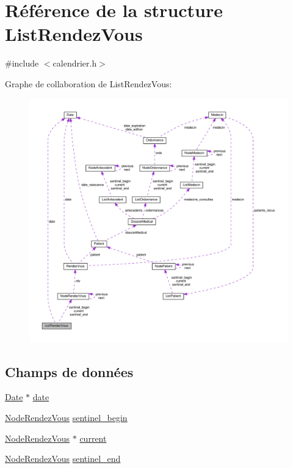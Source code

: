 \hypertarget{struct_list_rendez_vous}{\section{Référence de la structure List\-Rendez\-Vous}
\label{struct_list_rendez_vous}
}


{\ttfamily \#include $<$calendrier.\-h$>$}



Graphe de collaboration de List\-Rendez\-Vous\-:
\nopagebreak
\begin{figure}[H]
\begin{center}
\leavevmode
\includegraphics[width=350pt]{struct_list_rendez_vous__coll__graph}
\end{center}
\end{figure}
\subsection*{Champs de données}
\begin{DoxyCompactItemize}
\item 
\hyperlink{struct_date}{Date} $\ast$ \hyperlink{struct_list_rendez_vous_a73fc78564c9badbcea68f2f2331c74db}{date}
\item 
\hyperlink{struct_node_rendez_vous}{Node\-Rendez\-Vous} \hyperlink{struct_list_rendez_vous_a557d4ad3f27cc277dbd188dd7edc897c}{sentinel\-\_\-begin}
\item 
\hyperlink{struct_node_rendez_vous}{Node\-Rendez\-Vous} $\ast$ \hyperlink{struct_list_rendez_vous_af4abed97401227a9dc25377d0840dd36}{current}
\item 
\hyperlink{struct_node_rendez_vous}{Node\-Rendez\-Vous} \hyperlink{struct_list_rendez_vous_a23ecc58b8762108d2cdf8d71b1848178}{sentinel\-\_\-end}
\end{DoxyCompactItemize}


